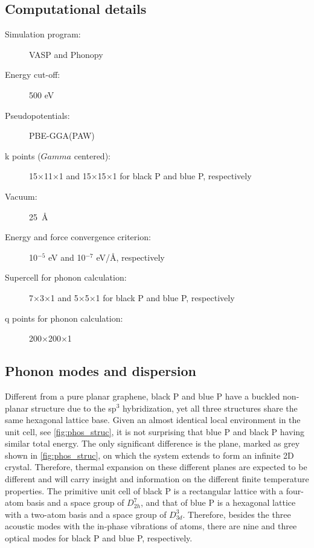 \subsection{Computational details}

\begin{footnotesize}
\begin{description}
\item[Simulation program:] VASP and Phonopy\cite{phonopy_code}
\item[Energy cut-off:] 500 eV
\item[Pseudopotentials:] PBE-GGA(PAW)
\item[k points ($Gamma$ centered):] 15$\times$11$\times$1 and 15$\times$15$\times$1 for black P and blue P, respectively 
\item[Vacuum:] 25~\AA
\item[Energy and force convergence criterion:] 10$^{-5}$ eV and 10$^{-7}$ eV/\AA, respectively
\item[Supercell for phonon calculation:] 7$\times$3$\times$1 and 5$\times$5$\times$1 for black P and blue P, respectively
\item[q points for phonon calculation:] 200$\times$200$\times$1
\end{description}
\end{footnotesize}

\subsection{Phonon modes and dispersion \label{sec:pho_phos}}

Different from a pure planar graphene, black P and blue P have a buckled non-planar structure due to the sp$^3$ hybridization, yet all three structures share the same hexagonal lattice base. Given an almost identical local environment in the unit cell, see \autoref{fig:phos_struc}, it is not surprising that blue P and black P having similar total energy. The only significant difference is the plane, marked as grey shown in \autoref{fig:phos_struc}, on which the system extends to form an infinite 2D crystal. Therefore, thermal expansion on these different planes are expected to be different and will carry insight and information on the different finite temperature properties. The primitive unit cell of black P is a rectangular lattice with a four-atom basis and a space group of $D_{2h}^7$, and that of blue P is a hexagonal lattice with a two-atom basis and a space group of  $D_{3d}^3$. Therefore, besides the three acoustic modes with the in-phase vibrations of atoms, there are nine and three optical modes for black P and blue P, respectively. 

